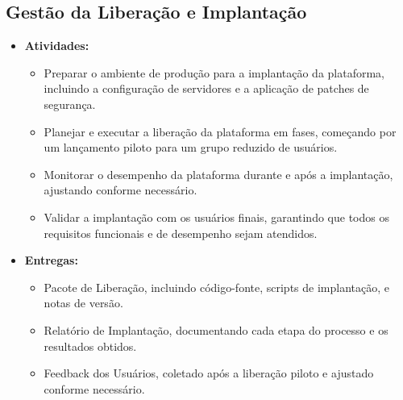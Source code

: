 \documentclass{article}
\begin{document}
\subsection{Gestão da Liberação e Implantação}
\begin{itemize}
    \item \textbf{Atividades:}
    \begin{itemize}
        \item Preparar o ambiente de produção para a implantação da plataforma, incluindo a configuração de servidores e a aplicação de patches de segurança.
        \item Planejar e executar a liberação da plataforma em fases, começando por um lançamento piloto para um grupo reduzido de usuários.
        \item Monitorar o desempenho da plataforma durante e após a implantação, ajustando conforme necessário.
        \item Validar a implantação com os usuários finais, garantindo que todos os requisitos funcionais e de desempenho sejam atendidos.
    \end{itemize}
    \item \textbf{Entregas:}
    \begin{itemize}
        \item Pacote de Liberação, incluindo código-fonte, scripts de implantação, e notas de versão.
        \item Relatório de Implantação, documentando cada etapa do processo e os resultados obtidos.
        \item Feedback dos Usuários, coletado após a liberação piloto e ajustado conforme necessário.
    \end{itemize}
\end{itemize}
\end{document}
